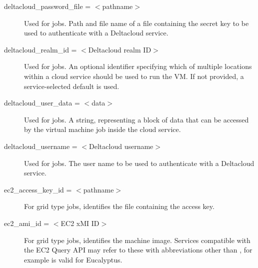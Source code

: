 \begin{description}
\label{condor-submit-deltacloud-password-file}
\item[deltacloud\_password\_file = $<$pathname$>$]
Used for  jobs.
Path and file name of a file containing the secret key to be used to
authenticate with a Deltacloud service.


\label{condor-submit-deltacloud-realm-id}
\item[deltacloud\_realm\_id = $<$Deltacloud realm ID$>$]
Used for  jobs.
An optional identifier specifying which of multiple locations within a
cloud service should be used to run the VM. If not provided, a
service-selected default is used.


\label{condor-submit-deltacloud-user-data}
\item[deltacloud\_user\_data = $<$data$>$]
Used for  jobs.
A string, representing a block of data that can be accessed 
by the virtual machine job inside the cloud service.


\label{condor-submit-deltacloud-username}
\item[deltacloud\_username = $<$Deltacloud username$>$]
Used for  jobs.
The user name to be used to authenticate with a Deltacloud service.


\label{condor-submit-ec2-access-key-id}
\item[ec2\_access\_key\_id = $<$pathname$>$]
For grid type  jobs,
identifies the file containing the access key.  


\label{condor-submit-ec2-ami-id}
\item[ec2\_ami\_id = $<$EC2 xMI ID$>$]
For grid type  jobs, identifies the machine image.
Services compatible with the EC2 Query API may refer to these
with abbreviations other than ,
for example  is valid for Eucalyptus.


\end{description}
